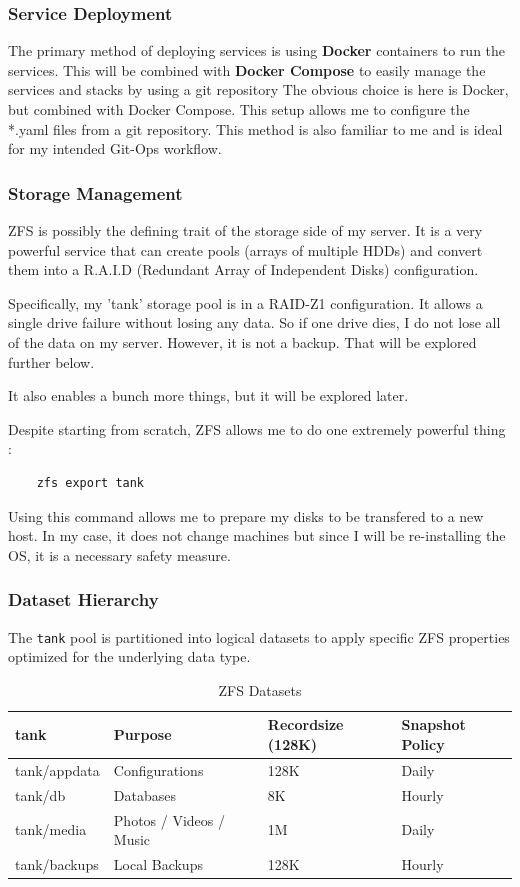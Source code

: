 \subsubsection{Service Deployment}
The primary method of deploying services is using \textbf{Docker} containers to run the services.
This will be combined with \textbf{Docker Compose} to easily manage the services and stacks by using a git repository
The obvious choice is here is Docker, but combined with Docker Compose.
This setup allows me to configure the *.yaml files from a git repository. 
This method is also familiar to me and is ideal for my intended Git-Ops workflow.



\subsubsection{Storage Management}
ZFS is possibly the defining trait of the storage side of my server.
It is a very powerful service that can create pools (arrays of multiple HDDs) and convert them into a
R.A.I.D (Redundant Array of Independent Disks) configuration.


Specifically, my 'tank' storage pool is in a RAID-Z1 configuration.
It allows a single drive failure without losing any data. So if one drive dies, I do not lose all of the data on my server.
However, it is not a backup. That will be explored further below.

It also enables a bunch more things, but it will be explored later.

Despite starting from scratch, ZFS allows me to do one extremely powerful thing :
\begin{verbatim}
    zfs export tank
\end{verbatim}

Using this command allows me to prepare my disks to be transfered to a new host. 
In my case, it does not change machines but since I will be re-installing the OS, it is a necessary safety measure.

\subsubsection{Dataset Hierarchy}
The \texttt{tank} pool is partitioned into logical datasets to apply specific ZFS properties optimized for the underlying data type.

\begin{table}[h]
    \centering
    \begin{tabular}{|l|l|l|l|}
        \hline
         \textbf{tank} & \textbf{Purpose} & \textbf{Recordsize} (128K) & \textbf{Snapshot Policy} \\ \hline
         tank/appdata & Configurations & 128K & Daily \\
         tank/db & Databases & 8K & Hourly \\
         tank/media & Photos / Videos / Music & 1M & Daily \\
         tank/backups & Local Backups & 128K & Hourly \\ \hline
    \end{tabular}
    \caption{ZFS Datasets}
    \label{tab:placeholder}
\end{table}

